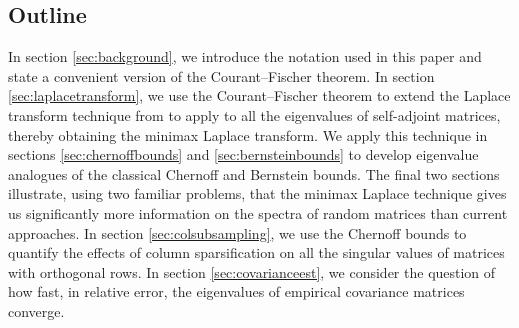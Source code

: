 \documentclass[11pt,letterpaper,twoside,reqno,nosumlimits]{amsart}
\theoremstyle{remark}
\numberwithin{equation}{section}
\numberwithin{thm}{section}
\numberwithin{prop}{section}
\numberwithin{defn}{section}
\numberwithin{remark}{section}
\begin{document}


\subsection{Outline}
In section \ref{sec:background}, we introduce the notation used in this paper and state a convenient version of the Courant--Fischer theorem. In section \ref{sec:laplacetransform}, we use the Courant--Fischer theorem to extend the Laplace transform technique from \cite{T10a} to apply to all the eigenvalues of self-adjoint matrices, thereby obtaining the minimax Laplace transform. We apply this technique in sections \ref{sec:chernoffbounds} and \ref{sec:bernsteinbounds} to develop eigenvalue analogues of the classical Chernoff and Bernstein bounds. The final two sections illustrate, using two familiar problems, that the minimax Laplace technique gives us significantly more information on the spectra of random matrices than current approaches. In section \ref{sec:colsubsampling}, we use the Chernoff bounds to quantify the effects of column sparsification on all the singular values of matrices with orthogonal rows. In section \ref{sec:covarianceest}, we consider the question of how fast, in relative error, the eigenvalues of empirical covariance matrices converge.
\end{document}
